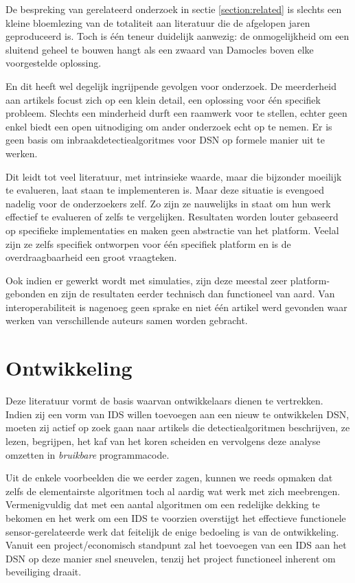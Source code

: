 De bespreking van gerelateerd onderzoek in sectie \ref{section:related} is
slechts een kleine bloemlezing van de totaliteit aan literatuur die de
afgelopen jaren geproduceerd is. Toch is \'e\'en teneur duidelijk aanwezig: de
onmogelijkheid om een sluitend geheel te bouwen hangt als een zwaard van
Damocles boven elke voorgestelde oplossing.

En dit heeft wel degelijk ingrijpende gevolgen voor onderzoek. De meerderheid
aan artikels focust zich op een klein detail, een oplossing voor \'e\'en
specifiek probleem. Slechts een minderheid durft een raamwerk voor te stellen,
echter geen enkel biedt een open uitnodiging om ander onderzoek echt op te
nemen. Er is geen basis om inbraakdetectiealgoritmes voor DSN op formele manier
uit te werken.

Dit leidt tot veel literatuur, met intrinsieke waarde, maar die bijzonder
moeilijk te evalueren, laat staan te implementeren is. Maar deze situatie is
evengoed nadelig voor de onderzoekers zelf. Zo zijn ze nauwelijks in staat om
hun werk effectief te evalueren of zelfs te vergelijken. Resultaten worden
louter gebaseerd op specifieke implementaties en maken geen abstractie van het
platform. Veelal zijn ze zelfs specifiek ontworpen voor \'e\'en specifiek
platform en is de overdraagbaarheid een groot vraagteken.

Ook indien er gewerkt wordt met simulaties, zijn deze meestal zeer
platform-gebonden en zijn de resultaten eerder technisch dan functioneel van
aard. Van interoperabiliteit is nagenoeg geen sprake en niet \'e\'en artikel
werd gevonden waar werken van verschillende auteurs samen worden gebracht.

\section{Ontwikkeling}
\label{section:problem-develop}

Deze literatuur vormt de basis waarvan ontwikkelaars dienen te vertrekken.
Indien zij een vorm van IDS willen toevoegen aan een nieuw te ontwikkelen DSN,
moeten zij actief op zoek gaan naar artikels die detectiealgoritmen
beschrijven, ze lezen, begrijpen, het kaf van het koren scheiden en vervolgens
deze analyse omzetten in \emph{bruikbare} programmacode.

Uit de enkele voorbeelden die we eerder zagen, kunnen we reeds opmaken dat
zelfs de elementairste algoritmen toch al aardig wat werk met zich meebrengen.
Vermenigvuldig dat met een aantal algoritmen om een redelijke dekking te
bekomen en het werk om een IDS te voorzien overstijgt het effectieve
functionele sensor-gerelateerde werk dat feitelijk de enige bedoeling is van de
ontwikkeling. Vanuit een project/economisch standpunt zal het toevoegen van een
IDS aan het DSN op deze manier snel sneuvelen, tenzij het project functioneel
inherent om beveiliging draait.

